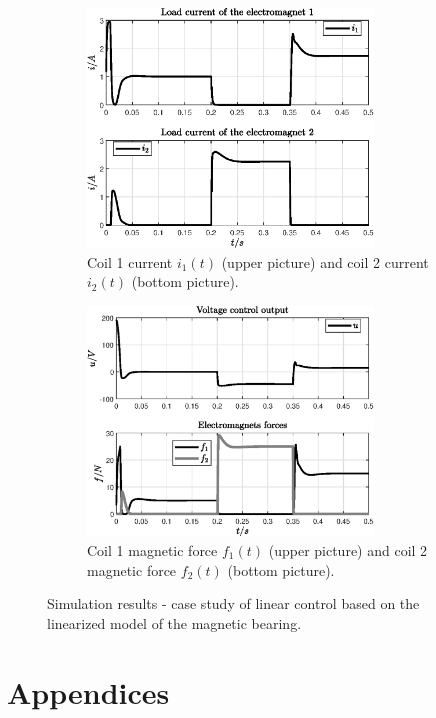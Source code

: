 \documentclass[11pt,a4paper,oneside]{book}
\numberwithin{equation}{section}
\theoremstyle{it}
\theoremstyle{definition}
\begin{document}
\begin{figure}[H]
	\centering
	\begin{subfigure}{0.5\textwidth}
		\centering
		\includegraphics[width = 215pt, angle = 0, 
		keepaspectratio]{figures/magnetic_bearing/sim_results/magnetic_bearing_fig3.eps}
		\captionsetup{width=0.65\textwidth, font=footnotesize}	
		\caption{Coil 1 current $i_1(t)$ (upper picture) and coil 2 current $i_2(t)$ (bottom picture).}
		\label{}
	\end{subfigure}%
	\begin{subfigure}{0.5\textwidth}
		\centering
		\includegraphics[width = 215pt, angle = 0, 
		keepaspectratio]{figures/magnetic_bearing/sim_results/magnetic_bearing_fig4.eps}
		\captionsetup{width=0.65\textwidth, font=footnotesize}	
		\caption{Coil 1 magnetic force $f_1(t)$ (upper picture) and coil 2 magnetic force $f_2(t)$ (bottom picture).}
		\label{}
	\end{subfigure}
	\captionsetup{width=0.5\textwidth, font=small}	
	\caption{Simulation results - case study of linear control based on the linearized model of the magnetic bearing.}
	\label{}
\end{figure}



\chapter{Appendices}
\end{document}
